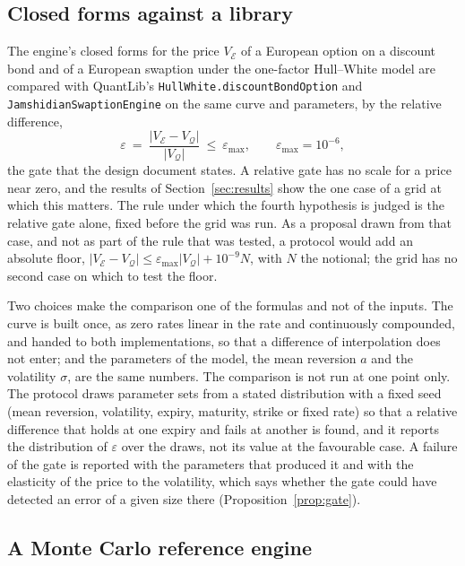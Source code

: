 \subsection{Closed forms against a library}
\label{sec:proposed-closed}

The engine's closed forms for the price $V_{\mathcal{E}}$ of a European option on a discount bond and of a European swaption under the one-factor Hull--White model are compared with QuantLib's \texttt{HullWhite.discountBondOption} and \texttt{JamshidianSwaptionEngine} on the same curve and parameters, by the relative difference,
\begin{equation}
\varepsilon\ =\ \frac{\lvert V_{\mathcal{E}}-V_{\mathcal{Q}}\rvert}{\lvert V_{\mathcal{Q}}\rvert}\ \le\ \varepsilon_{\max},\qquad \varepsilon_{\max}=10^{-6},
\label{eq:closed-rel}
\end{equation}
the gate that the design document states. A relative gate has no scale for a price near zero, and the results of Section~\ref{sec:results} show the one case of a grid at which this matters. The rule under which the fourth hypothesis is judged is the relative gate alone, fixed before the grid was run. As a proposal drawn from that case, and not as part of the rule that was tested, a protocol would add an absolute floor, $\lvert V_{\mathcal{E}}-V_{\mathcal{Q}}\rvert\le\varepsilon_{\max}\lvert V_{\mathcal{Q}}\rvert+10^{-9}N$, with $N$ the notional; the grid has no second case on which to test the floor.

Two choices make the comparison one of the formulas and not of the inputs. The curve is built once, as zero rates linear in the rate and continuously compounded, and handed to both implementations, so that a difference of interpolation does not enter; and the parameters of the model, the mean reversion $a$ and the volatility $\sigma$, are the same numbers. The comparison is not run at one point only. The protocol draws parameter sets from a stated distribution with a fixed seed (mean reversion, volatility, expiry, maturity, strike or fixed rate) so that a relative difference that holds at one expiry and fails at another is found, and it reports the distribution of $\varepsilon$ over the draws, not its value at the favourable case. A failure of the gate is reported with the parameters that produced it and with the elasticity of the price to the volatility, which says whether the gate could have detected an error of a given size there (Proposition~\ref{prop:gate}).

\subsection{A Monte Carlo reference engine}
\label{sec:proposed-engine}


